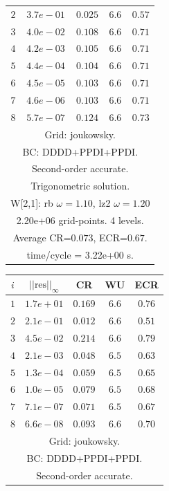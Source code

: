 \begin{table}[hbt]
\begin{center}
{\begin{tabular}{|c|c|c|c|c|}
 $ 2$  & $ 3.7e-01$ & $0.025$ & $ 6.6$ & $0.57$ \\ 
 $ 3$  & $ 4.0e-02$ & $0.108$ & $ 6.6$ & $0.71$ \\ 
 $ 4$  & $ 4.2e-03$ & $0.105$ & $ 6.6$ & $0.71$ \\ 
 $ 5$  & $ 4.4e-04$ & $0.104$ & $ 6.6$ & $0.71$ \\ 
 $ 6$  & $ 4.5e-05$ & $0.103$ & $ 6.6$ & $0.71$ \\ 
 $ 7$  & $ 4.6e-06$ & $0.103$ & $ 6.6$ & $0.71$ \\ 
 $ 8$  & $ 5.7e-07$ & $0.124$ & $ 6.6$ & $0.73$ \\ 
\hline 
\multicolumn{5}{|c|}{Grid: joukowsky.}  \\
\multicolumn{5}{|c|}{BC: DDDD+PPDI+PPDI.}  \\
\multicolumn{5}{|c|}{Second-order accurate.}  \\
\multicolumn{5}{|c|}{Trigonometric solution.}  \\
\multicolumn{5}{|c|}{W[2,1]: rb $\omega=1.10$, lz2 $\omega=1.20$}  \\
\multicolumn{5}{|c|}{2.20e+06 grid-points. 4 levels.}  \\
\multicolumn{5}{|c|}{Average CR=$0.073$, ECR=$0.67$.}  \\
\multicolumn{5}{|c|}{time/cycle = 3.22e+00 s.}  \\
\hline 
\end{tabular}
\qquad
\begin{tabular}{|c|c|c|c|c|} \hline 
 $i$   & $\vert\vert\mbox{res}\vert\vert_\infty$  &  CR     &  WU    & ECR  \\   \hline 
 $ 1$  & $ 1.7e+01$ & $0.169$ & $ 6.6$ & $0.76$ \\ 
 $ 2$  & $ 2.1e-01$ & $0.012$ & $ 6.6$ & $0.51$ \\ 
 $ 3$  & $ 4.5e-02$ & $0.214$ & $ 6.6$ & $0.79$ \\ 
 $ 4$  & $ 2.1e-03$ & $0.048$ & $ 6.5$ & $0.63$ \\ 
 $ 5$  & $ 1.3e-04$ & $0.059$ & $ 6.5$ & $0.65$ \\ 
 $ 6$  & $ 1.0e-05$ & $0.079$ & $ 6.5$ & $0.68$ \\ 
 $ 7$  & $ 7.1e-07$ & $0.071$ & $ 6.5$ & $0.67$ \\ 
 $ 8$  & $ 6.6e-08$ & $0.093$ & $ 6.6$ & $0.70$ \\ 
\hline 
\multicolumn{5}{|c|}{Grid: joukowsky.}  \\
\multicolumn{5}{|c|}{BC: DDDD+PPDI+PPDI.}  \\
\multicolumn{5}{|c|}{Second-order accurate.}  \\

\end{tabular}}
\end{center}
\end{table}
